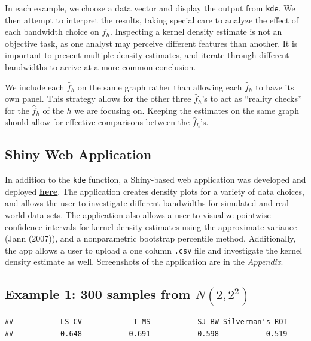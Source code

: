 \documentclass[]{article}
\begin{document}
In each example, we choose a data vector and display the output from
\texttt{kde}. We then attempt to interpret the results, taking special
care to analyze the effect of each bandwidth choice on \(\hat{f}_h\).
Inspecting a kernel density estimate is not an objective task, as one
analyst may perceive different features than another. It is important to
present multiple density estimates, and iterate through different
bandwidths to arrive at a more common conclusion.

We include each \(\hat f_h\) on the same graph rather than allowing each
\(\hat f_h\) to have its own panel. This strategy allows for the other
three \(\hat f_h\)'s to act as ``reality checks'' for the \(\hat f_h\)
of the \(h\) we are focusing on. Keeping the estimates on the same graph
should allow for effective comparisons between the \(\hat f_h\)'s.

\subsection{Shiny Web Application}

In addition to the \texttt{kde} function, a Shiny-based web application
was developed and deployed
\textbf{\href{http://www.statlab.wisc.edu/shiny/Bandwidths_For_UnivariateKDE/}{here}}.
The application creates density plots for a variety of data choices, and
allows the user to investigate different bandwidths for simulated and
real-world data sets. The application also allows a user to visualize
pointwise confidence intervals for kernel density estimates using the
approximate variance (Jann (2007)), and a nonparametric bootstrap
percentile method. Additionally, the app allows a user to upload a one
column \texttt{.csv} file and investigate the kernel density estimate as
well. Screenshots of the application are in the \emph{Appendix}.

\subsection{Example 1: 300 samples from $N(2, 2^2)$}

\begin{verbatim}
##           LS CV            T MS           SJ BW Silverman's ROT 
##           0.648           0.691           0.598           0.519
\end{verbatim}
\end{document}
